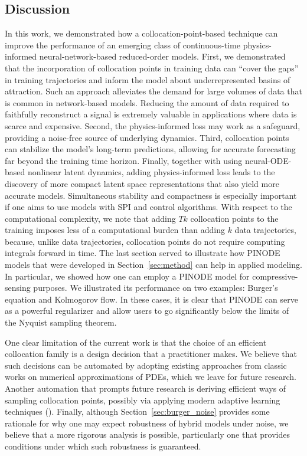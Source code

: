 \subsection{Discussion} 
In this work, we demonstrated how a collocation-point-based technique can improve the performance of an emerging class of continuous-time physics-informed neural-network-based reduced-order models. First, we demonstrated that the incorporation of collocation points in training data can ``cover the gaps'' in training trajectories and inform the model about underrepresented basins of attraction. Such an approach alleviates the demand for large volumes of data that is common in network-based models. Reducing the amount of data required to faithfully reconstruct a signal is extremely valuable in applications where data is scarce and expensive. Second, the physics-informed loss may work as a safeguard, providing a noise-free source of underlying dynamics.
Third, collocation points can stabilize the model's long-term predictions, allowing for accurate forecasting far beyond the training time horizon. Finally, together with using neural-ODE-based nonlinear latent dynamics, adding physics-informed loss leads to the discovery of more compact latent space representations that also yield more accurate models. Simultaneous stability and compactness is especially important if one aims to use models with SPI and control algorithms. With respect to the computational complexity, we note that adding $Tk$ collocation points to the training imposes less of a computational burden than adding $k$ data trajectories, because, unlike data trajectories, collocation points do not require computing integrals forward in time. The last section served to illustrate how PINODE models that were developed in Section~\ref{sec:method} can help in applied modeling. In particular, we showed how one can employ a PINODE model for compressive-sensing purposes. We illustrated its performance on two examples: Burger's equation and Kolmogorov flow. In these cases, it is clear that PINODE can serve as a powerful regularizer and allow users to go significantly below the limits of the Nyquist sampling theorem. 

One clear limitation of the current work is that the choice of an efficient collocation family is a design decision that a practitioner makes. We believe that such decisions can be automated by adopting existing approaches from classic works on numerical approximations of PDEs, which we leave for future research. Another automation that prompts future research is deriving efficient ways of sampling collocation points, possibly via applying modern adaptive learning techniques (\citep{subramanian2022adaptive}). Finally, although Section~\ref{sec:burger_noise} provides some rationale for why one may expect robustness of hybrid models under noise, we believe that a more rigorous analysis is possible, particularly one that provides conditions under which such robustness is guaranteed. 
